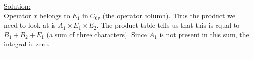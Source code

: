 \noindent
\underline{Solution:}\\

\noindent
Operator $x$ belongs to $E_1$ in $C_{6v}$ (the operator column). Thus the product we need to look at is $A_1\times E_1\times E_2$.
The product table tells us that this is equal to $B_1 + B_2 + E_1$ (a sum of three characters). Since $A_1$ is not present in this
sum, the integral is zero.\\

\hrule\vspace{0.5cm}
